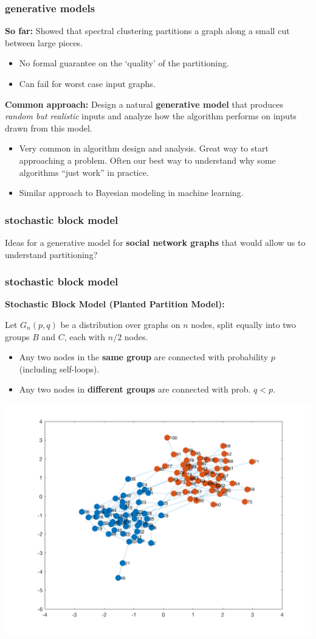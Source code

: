 \documentclass[compress]{beamer}
\begin{document}
\begin{frame}
	\frametitle{generative models}
	\textbf{So far:} Showed that spectral clustering partitions a graph along a small cut between large pieces.   
	\begin{itemize}
		\item No formal guarantee on the `quality' of the partitioning.
		\item Can fail for worst case input graphs.
	\end{itemize}
	\textbf{Common approach:} Design a natural \alert{\textbf{generative model}} that produces \emph{random but realistic} inputs and analyze how the algorithm performs on inputs drawn from this model.
	\begin{itemize}
		\item Very common in algorithm design and analysis. Great way to start approaching a problem. Often our best way to understand why some algorithms ``just work'' in practice.
		\item Similar approach to Bayesian modeling in machine learning.
	\end{itemize}
\end{frame}


\begin{frame}[t]
	\frametitle{stochastic block model}
	\begin{center}
		\alert{Ideas for a generative model for \textbf{social network graphs} that would allow us to understand partitioning?}
	\end{center}
	
\end{frame}

\begin{frame}
	\frametitle{stochastic block model}
	\textbf{Stochastic Block Model (Planted Partition Model):} 
	
	Let $G_n(p,q)$ be a distribution over graphs on $n$ nodes, split equally into two groups $B$ and $C$, each with $n/2$ nodes.
	\begin{itemize}
		\item Any two nodes in the \textbf{\alert{same group}} are connected with probability $p$ (including self-loops).
		\item Any two nodes in \textbf{\alert{different groups}} are connected with prob. $q < p$.
	\end{itemize}
	\vspace{-1em}
	\begin{center}
		\includegraphics[width=.5\textwidth]{stochasticBlock.png}
	\end{center}
\end{frame}
\end{document}
